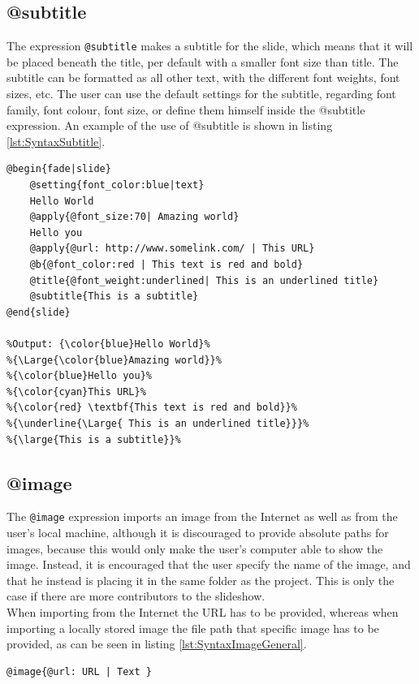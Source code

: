 {\subsection{@subtitle}
The expression \texttt{@subtitle} makes a subtitle for the slide, which means that it will be placed beneath the title, per default with a smaller font size than title. The subtitle can be formatted as all other text, with the different font weights, font sizes, etc. The user can use the default settings for the subtitle, regarding font family, font colour, font size, or define them himself inside the @subtitle expression.
An example of the use of @subtitle is shown in listing \ref{lst:SyntaxSubtitle}.
\begin{lstlisting}[frame=single, caption=Hello World with subtitle, label=lst:SyntaxSubtitle]
@begin{fade|slide}
    @setting{font_color:blue|text}
    Hello World
    @apply{@font_size:70| Amazing world}
    Hello you
    @apply{@url: http://www.somelink.com/ | This URL}
    @b{@font_color:red | This text is red and bold}
    @title{@font_weight:underlined| This is an underlined title}
    @subtitle{This is a subtitle}
@end{slide}

%Output: {\color{blue}Hello World}%
%{\Large{\color{blue}Amazing world}}%
%{\color{blue}Hello you}%
%{\color{cyan}This URL}%
%{\color{red} \textbf{This text is red and bold}}%
%{\underline{\Large{ This is an underlined title}}}%
%{\large{This is a subtitle}}%
\end{lstlisting}

\subsection{@image}
The \texttt{@image} expression imports an image from the Internet as well as from the user's local machine, although it is discouraged to provide absolute paths for images, because this would only make the user's computer able to show the image. Instead, it is encouraged that the user specify the name of the image, and that he instead is placing it in the same folder as the project. This is only the case if there are more contributors to the slideshow.\\
When importing from the Internet the URL has to be provided, whereas when importing a locally stored image the file path that specific image has to be provided, as can be seen in listing \ref{lst:SyntaxImageGeneral}.

\begin{lstlisting}[frame=single, caption=Image expression generic, label=lst:SyntaxImageGeneral]
@image{@url: URL | Text }
\end{lstlisting}

}
